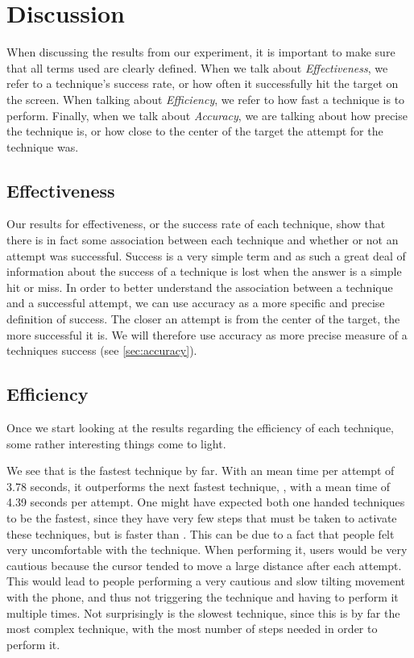 \section{Discussion}\label{sec:discussion}
When discussing the results from our experiment, it is important to make sure that all terms used are clearly defined. When we talk about \emph{Effectiveness}, we refer to a technique's success rate, or how often it successfully hit the target on the screen. When talking about \emph{Efficiency}, we refer to how fast a technique is to perform. Finally, when we talk about \emph{Accuracy}, we are talking about how precise the technique is, or how close to the center of the target the attempt for the technique was. 

\subsection{Effectiveness}

Our results for effectiveness, or the success rate of each technique, show that there is in fact some association between each technique and whether or not an attempt was successful.
Success is a very simple term and as such a great deal of information about the success of a technique is lost when the answer is a simple hit or miss. 
In order to better understand the association between a technique and a successful attempt, we can use accuracy as a more specific and precise definition of success.
The closer an attempt is from the center of the target, the more successful it is.
We will therefore use accuracy as more precise measure of a techniques success (see \cref{sec:accuracy}).


\subsection{Efficiency}

Once we start looking at the results regarding the efficiency of each technique, some rather interesting things come to light.

We see that \swipe is the fastest technique by far.
With an mean time per attempt of 3.78 seconds, it outperforms the next fastest technique, \throw, with a mean time of 4.39 seconds per attempt. 
One might have expected both one handed techniques to be the fastest, since they have very few steps that must be taken to activate these techniques, but \throw is faster than \tilt. 
This can be due to a fact that people felt very uncomfortable with the \tilt technique.
When performing it, users would be very cautious because the cursor tended to move a large distance after each attempt.
This would lead to people performing a very cautious and slow tilting movement with the phone, and thus not triggering the technique and having to perform it multiple times. 
Not surprisingly \grab is the slowest technique, since this is by far the most complex technique, with the most number of steps needed in order to perform it.

